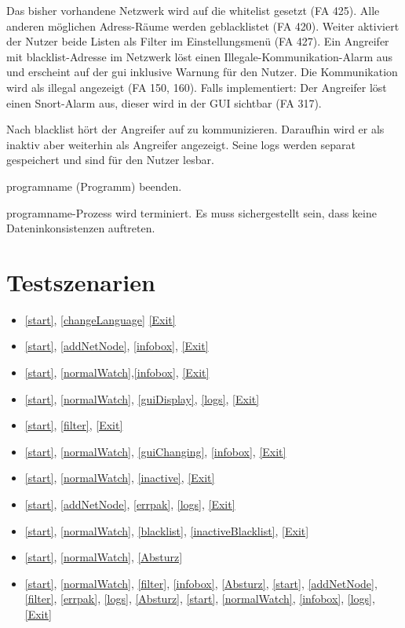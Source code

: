 \begin{description}[style=multiline, leftmargin=4cm, labelwidth=4cm]
  \item[\namedlabel{blacklist}{Blacklist}] Das bisher vorhandene Netzwerk wird auf die \gls{whitelist} gesetzt (FA 425). Alle anderen möglichen Adress-Räume werden geblacklistet (FA 420). Weiter aktiviert der Nutzer beide Listen als Filter im Einstellungsmenü (FA 427). Ein Angreifer mit \gls{blacklist}-Adresse im Netzwerk löst einen Illegale-Kommunikation-Alarm aus und erscheint auf der \gls{gui} inklusive Warnung für den Nutzer. Die Kommunikation wird als illegal angezeigt (FA 150, 160). Falls implementiert: Der Angreifer löst einen Snort-Alarm aus, dieser wird in der GUI sichtbar (FA 317).
  \item[\namedlabel{inactiveBlacklist}{Inaktiver geblacklisteter Teilnehmer}] Nach \gls{blacklist} hört der Angreifer auf zu kommunizieren. Daraufhin wird er als inaktiv aber weiterhin als Angreifer angezeigt. Seine \glspl{log} werden separat gespeichert und sind für den Nutzer lesbar.
  \item[\namedlabel{Exit}{Exit}] \gls{programname} (Programm) beenden.
  \item[\namedlabel{Absturz}{Absturz}] \gls{programname}-Prozess wird terminiert. Es muss sichergestellt sein, dass keine Dateninkonsistenzen auftreten.
\end{description}

\section{Testszenarien}

\begin{itemize}
  \item \ref{start}, \ref{changeLanguage} \ref{Exit}
  \item \ref{start}, \ref{addNetNode}, \ref{infobox}, \ref{Exit}
  \item \ref{start}, \ref{normalWatch},\ref{infobox}, \ref{Exit}
  \item \ref{start}, \ref{normalWatch}, \ref{guiDisplay}, \ref{logs}, \ref{Exit}
  \item \ref{start}, \ref{filter}, \ref{Exit}
  \item \ref{start}, \ref{normalWatch}, \ref{guiChanging}, \ref{infobox}, \ref{Exit}
  \item \ref{start}, \ref{normalWatch}, \ref{inactive}, \ref{Exit}
  \item \ref{start}, \ref{addNetNode}, \ref{errpak}, \ref{logs}, \ref{Exit}
  \item \ref{start}, \ref{normalWatch}, \ref{blacklist}, \ref{inactiveBlacklist}, \ref{Exit}
  \item \ref{start}, \ref{normalWatch}, \ref{Absturz}
  \item \ref{start}, \ref{normalWatch}, \ref{filter}, \ref{infobox}, \ref{Absturz}, \ref{start}, \ref{addNetNode}, \ref{filter}, \ref{errpak}, \ref{logs}, \ref{Absturz}, \ref{start}, \ref{normalWatch}, \ref{infobox}, \ref{logs}, \ref{Exit}
\end{itemize}
